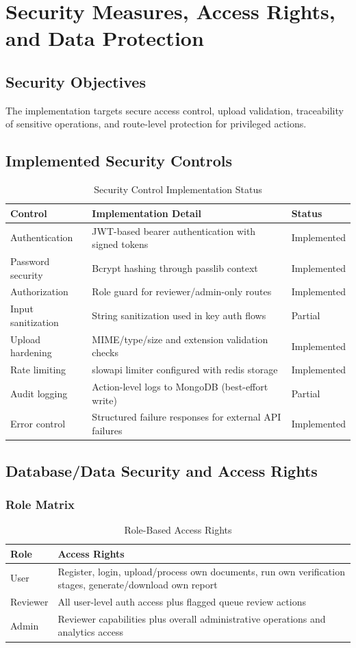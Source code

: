 \chapter{Security Measures, Access Rights, and Data Protection}

\section{Security Objectives}
The implementation targets secure access control, upload validation, traceability of sensitive operations, and route-level protection for privileged actions.

\section{Implemented Security Controls}
\begin{longtable}{p{4.2cm}p{7.2cm}p{2.5cm}}
\caption{Security Control Implementation Status}\\
\toprule
Control & Implementation Detail & Status \\
\midrule
Authentication & JWT-based bearer authentication with signed tokens & Implemented \\
Password security & Bcrypt hashing through passlib context & Implemented \\
Authorization & Role guard for reviewer/admin-only routes & Implemented \\
Input sanitization & String sanitization used in key auth flows & Partial \\
Upload hardening & MIME/type/size and extension validation checks & Implemented \\
Rate limiting & slowapi limiter configured with redis storage & Implemented \\
Audit logging & Action-level logs to MongoDB (best-effort write) & Partial \\
Error control & Structured failure responses for external API failures & Implemented \\
\bottomrule
\end{longtable}

\section{Database/Data Security and Access Rights}
\subsection{Role Matrix}
\begin{longtable}{p{3.0cm}p{8.8cm}}
\caption{Role-Based Access Rights}\\
\toprule
Role & Access Rights \\
\midrule
User & Register, login, upload/process own documents, run own verification stages, generate/download own report \\
Reviewer & All user-level auth access plus flagged queue review actions \\
Admin & Reviewer capabilities plus overall administrative operations and analytics access \\
\bottomrule
\end{longtable}

